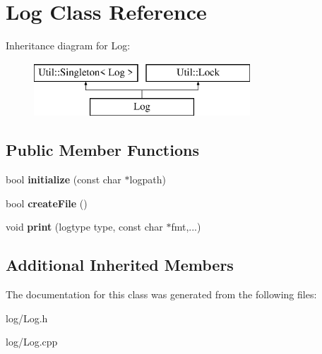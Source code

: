 \hypertarget{class_log}{}\section{Log Class Reference}
\label{class_log}
Inheritance diagram for Log\+:\begin{figure}[H]
\begin{center}
\leavevmode
\includegraphics[height=2.000000cm]{class_log}
\end{center}
\end{figure}
\subsection*{Public Member Functions}
\begin{DoxyCompactItemize}
\item 
\mbox{\label{class_log_a3e67ef6fb8b7e022f7c8273594b19081}} 
bool {\bfseries initialize} (const char $\ast$logpath)
\item 
\mbox{\label{class_log_a1206662f5fa82b744e79f554ca614e73}} 
bool {\bfseries create\+File} ()
\item 
\mbox{\label{class_log_ab68da125c42590ef825900948e8239df}} 
void {\bfseries print} (logtype type, const char $\ast$fmt,...)
\end{DoxyCompactItemize}
\subsection*{Additional Inherited Members}


The documentation for this class was generated from the following files\+:\begin{DoxyCompactItemize}
\item 
log/Log.\+h\item 
log/Log.\+cpp\end{DoxyCompactItemize}
